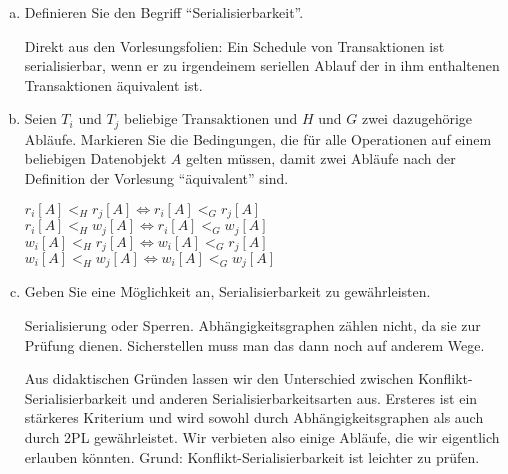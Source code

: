 \begin{enumerate}[a)]
\item Definieren Sie den Begriff "`Serialisierbarkeit"'.

\begin{solution}
Direkt aus den Vorlesungsfolien:
Ein Schedule von Transaktionen ist serialisierbar, wenn er zu irgendeinem seriellen Ablauf der in ihm enthaltenen Transaktionen äquivalent ist.
\end{solution}


\item Seien $T_i$ und $T_j$ beliebige Transaktionen und $H$ und $G$ zwei
  dazugehörige Abläufe. Markieren Sie die Bedingungen, die für alle
  Operationen auf einem beliebigen Datenobjekt $A$ gelten müssen, damit
  zwei Abläufe nach der Definition der Vorlesung "`äquivalent"' sind.

  \begin{itemize}
    \itemmc   \hspace*{0.45em} $r_i[A] <_H r_j[A] \Leftrightarrow r_i[A] <_G r_j[A]$
    \itemmcsol \hspace*{0.45em} $r_i[A] <_H w_j[A] \Leftrightarrow r_i[A] <_G w_j[A]$
    \itemmcsol \hspace*{0.45em} $w_i[A] <_H r_j[A] \Leftrightarrow w_i[A] <_G r_j[A]$
    \itemmcsol \hspace*{0.45em} $w_i[A] <_H w_j[A] \Leftrightarrow w_i[A] <_G w_j[A]$
  \end{itemize}

\item Geben Sie eine Möglichkeit an, Serialisierbarkeit zu gewährleisten.

\begin{solution}
Serialisierung oder Sperren.
Abhängigkeitsgraphen zählen nicht, da sie zur Prüfung dienen.
Sicherstellen muss man das dann noch auf anderem Wege.
\end{solution}

\begin{note}
Aus didaktischen Gründen lassen wir den Unterschied zwischen Konflikt-Serialisierbarkeit und anderen Serialisierbarkeitsarten aus.
Ersteres ist ein stärkeres Kriterium und wird sowohl durch Abhängigkeitsgraphen als auch durch 2PL gewährleistet.
Wir verbieten also einige Abläufe, die wir eigentlich erlauben könnten.
Grund: Konflikt-Serialisierbarkeit ist leichter zu prüfen.
\end{note}

\end{enumerate}
